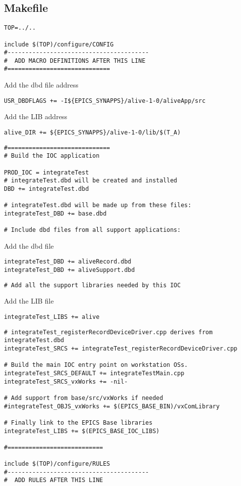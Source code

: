 \documentclass[11pt
  , a4paper
  , article
  , oneside
]{memoir}
\begin{document}
\subsection{Makefile}
\begin{lstlisting}[style=termstyle]
TOP=../..

include $(TOP)/configure/CONFIG
#----------------------------------------
#  ADD MACRO DEFINITIONS AFTER THIS LINE
#=============================
\end{lstlisting}
Add the dbd file address
\begin{lstlisting}[style=termstyle]
USR_DBDFLAGS += -I${EPICS_SYNAPPS}/alive-1-0/aliveApp/src
\end{lstlisting}
Add the LIB address
\begin{lstlisting}[style=termstyle]
alive_DIR += ${EPICS_SYNAPPS}/alive-1-0/lib/$(T_A)
\end{lstlisting}
\begin{lstlisting}[style=termstyle]
#=============================
# Build the IOC application

PROD_IOC = integrateTest
# integrateTest.dbd will be created and installed
DBD += integrateTest.dbd

# integrateTest.dbd will be made up from these files:
integrateTest_DBD += base.dbd

# Include dbd files from all support applications:
\end{lstlisting}
Add the dbd file
\begin{lstlisting}[style=termstyle]
integrateTest_DBD += aliveRecord.dbd
integrateTest_DBD += aliveSupport.dbd
\end{lstlisting}
\begin{lstlisting}[style=termstyle]
# Add all the support libraries needed by this IOC
\end{lstlisting}
Add the LIB file
\begin{lstlisting}[style=termstyle]
integrateTest_LIBS += alive
\end{lstlisting}
\begin{lstlisting}[style=termstyle]
# integrateTest_registerRecordDeviceDriver.cpp derives from integrateTest.dbd
integrateTest_SRCS += integrateTest_registerRecordDeviceDriver.cpp

# Build the main IOC entry point on workstation OSs.
integrateTest_SRCS_DEFAULT += integrateTestMain.cpp
integrateTest_SRCS_vxWorks += -nil-

# Add support from base/src/vxWorks if needed
#integrateTest_OBJS_vxWorks += $(EPICS_BASE_BIN)/vxComLibrary

# Finally link to the EPICS Base libraries
integrateTest_LIBS += $(EPICS_BASE_IOC_LIBS)

#===========================

include $(TOP)/configure/RULES
#----------------------------------------
#  ADD RULES AFTER THIS LINE
\end{lstlisting}
\end{document}
